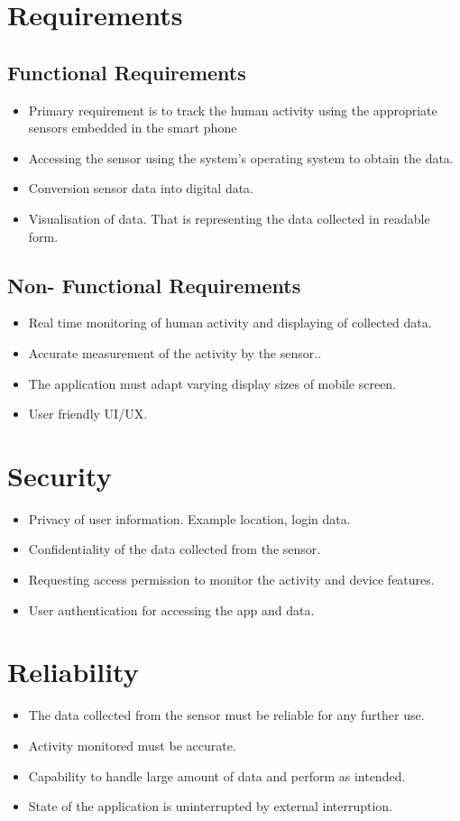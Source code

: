 \documentclass[conference]{IEEEtran}
\begin{document}
\section{Requirements}
\subsection{Functional Requirements}
\begin{itemize}
\item Primary requirement is to track the human activity using the appropriate sensors embedded in the smart phone
\item Accessing the sensor using the system's operating system to obtain the data.
\item Conversion sensor data into digital data.
\item Visualisation of data. That is representing the data collected in readable form.
\end{itemize}

\subsection{Non- Functional Requirements}
\begin{itemize}
\item Real time monitoring of human activity and displaying of collected data.
\item Accurate measurement of the activity by the sensor..
\item The application must adapt varying display sizes of mobile screen.
\item User friendly UI/UX.
\end{itemize}

\section{Security}
\begin{itemize}
\item Privacy of user information. Example location, login data.
\item Confidentiality of the data collected from the sensor.
\item Requesting access permission to monitor the activity and device features.
\item User authentication for accessing the app and data. 
\end{itemize}

\section{Reliability}
\begin{itemize}
\item The data collected from the sensor must be reliable for any further use.
\item Activity monitored must be accurate.
\item Capability to handle large amount of data and perform as intended.
\item State of the application is uninterrupted by external interruption.
\end{itemize}
\end{document}
